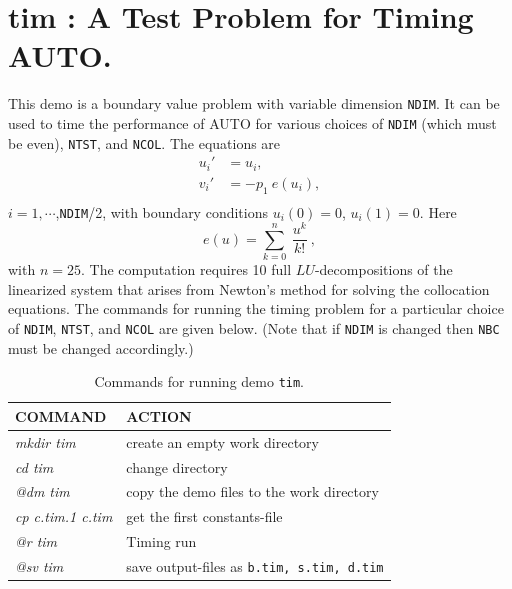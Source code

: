 \documentclass[12pt]{report}
\begin{document}
\section{ tim : A Test Problem for Timing {\cal AUTO}.} \label{sec:Demos_tim}
This demo is a boundary value problem with variable dimension {\tt NDIM}. 
It can be used to time the performance of {\cal AUTO} 
for various choices of {\tt NDIM} (which must be even), {\tt NTST}, and {\tt NCOL}.
The equations are
\begin{equation} \begin{array}{cl}
  u_i ' &= u_i  ,  \\
  v_i ' &= -p_1 ~  e(u_i) , \\
\end{array} \end{equation}
$i=1,\cdots$,{\tt NDIM}/2,
with boundary conditions $ u_i(0)=0$, $u_i(1)=0.$
Here 
$$ e(u) = \sum_{k=0}^{n} ~ \frac{u^k }{ k!} ~ , $$
with $n=25$.
The computation requires 10 full $LU$-decompositions of the linearized system
that arises from Newton's method for solving the collocation equations.
The commands for running the timing problem for a particular choice 
of {\tt NDIM}, {\tt NTST}, and {\tt NCOL} are given below.
(Note that if {\tt NDIM} is changed then {\tt NBC} must be changed accordingly.)

\begin{table}[htbp]
\begin{center}
\begin{tabular}{| l | l |}
\hline
  COMMAND  & ACTION \\
\hline
  {\it mkdir tim} & create an empty work directory \\ 
  {\it cd tim} & change directory \\
  {\it @dm tim} & copy the demo files to the work directory \\
\hline
  {\it cp c.tim.1 c.tim} & get the first constants-file \\ 
  {\it @r tim} & Timing run \\ 
  {\it @sv tim} & save output-files as {\tt b.tim, s.tim, d.tim} \\ 
\hline
\end{tabular}
\caption{Commands for running demo {\tt tim}.}
\label{tbl:demo_tim}
\end{center}
\end{table}
\end{document}
